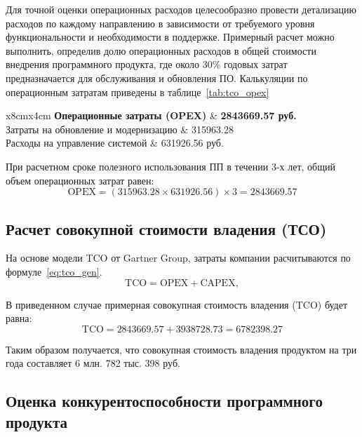 Для точной оценки операционных расходов целесообразно провести детализацию расходов по каждому направлению в зависимости от требуемого уровня функциональности и необходимости в поддержке. Примерный расчет можно выполнить, определив долю операционных расходов в общей стоимости внедрения программного продукта, где около 30\% годовых затрат предназначается для обслуживания и обновления ПО. Калькуляции по операционным затратам приведены в таблице~\ref{tab:tco_opex} 

\begin{table}[H]
	\caption{Расчет операционных затрат (OPEX)}
	\centering
	
	\emergencystretch=10pt
	\begin{tabular}{x{8cm}x{4cm}}
		\toprule
		\textbf{Операционные затраты  (OPEX)} & \textbf{2843669.57 руб.} \\ \midrule
		Затраты на обновление и модернизацию & 315963.28 \\
        Расходы на управление системой & 631926.56 руб.\\ \bottomrule
	\end{tabular}
	
	\label{tab:tco_opex}
\end{table}

При расчетном сроке полезного использования ПП в течении 3-х лет, общий объем операционных затрат равен:
$$\text{OPEX} = (315963.28 \times 631926.56) \times 3 = 2843669.57$$

\subsection{Расчет совокупной стоимости владения (ТСО)}

На основе модели TCO от Gartner Group, затраты компании расчитываются по формуле~\ref{eq:tco_gen}.
\begin{equation}
    \text{TCO} = \text{OPEX} + \text{CAPEX},
    \label{eq:tco_gen}
\end{equation}

В приведенном случае примерная совокупная стоимость владения (TCO) будет равна:
$$\text{TCO} = 2843669.57 + 3938728.73 = 6782398.27$$

Таким образом получается, что совокупная стоимость владения продуктом на три года составляет 6 млн. 782 тыс. 398 руб.

\subsection{Оценка конкурентоспособности программного продукта}

